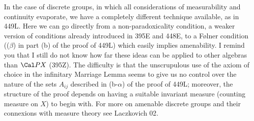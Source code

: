{In the case of discrete groups, in which all considerations of
measurability and continuity evaporate, we have a completely different
technique available, as in 449L.   Here we can go directly from a
non-paradoxicality condition, a weaker version of conditions already
introduced in 395E and 448E,
to a F{\o}lner condition (($\beta$) in part
(b) of the proof of 449L) which easily implies amenability.   I remind
you that I still do not know how far these ideas can be applied to
other algebras than $\Cal PX$ (395Z).   The difficulty is that the
unscrupulous use of the axiom of choice in the infinitary Marriage
Lemma seems to give us no control over the nature of the sets
$A_{ij}$ described in (b-$\alpha$) of the proof of 449L;  moreover, the
structure
of the proof depends on having a suitable invariant measure (counting
measure on $X$) to begin with.   For more on amenable discrete groups
and their connexions with measure theory see {\smc Laczkovich 02}.
}%

\discrpage

